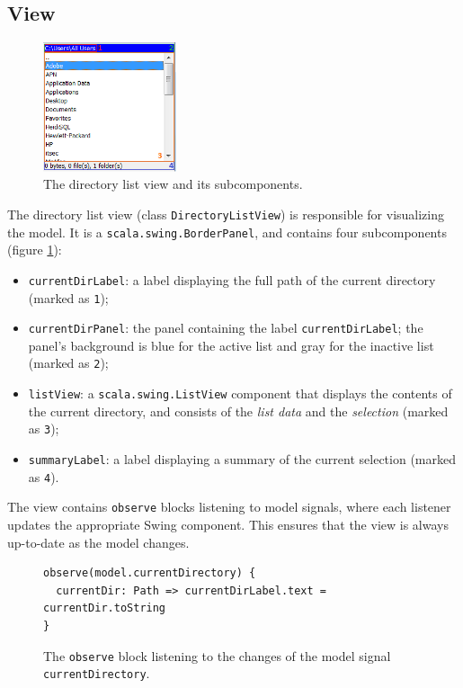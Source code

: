 \subsection{View}

\begin{figure}
  \centering
    \includegraphics[width=0.35\textwidth]{images/scala-commander-directoryListView.png}
  \caption{The directory list view and its subcomponents.}
  \label{fig:scomm_directoryListView}  
\end{figure}

The directory list view (class \texttt{DirectoryListView}) is responsible for visualizing the model. It is a \texttt{scala.swing.BorderPanel}, and contains four subcomponents (figure \ref{fig:scomm_directoryListView}):
\begin{itemize}
\item \texttt{currentDirLabel}: a label displaying the full path of the current directory (marked as \texttt{1});
\item \texttt{currentDirPanel}: the panel containing the label \texttt{currentDirLabel}; the panel's background is blue for the active list and gray for the inactive list (marked as \texttt{2});
\item \texttt{listView}: a \texttt{scala.swing.ListView} component that displays the contents of the current directory, and consists of the \emph{list data} and the \emph{selection} (marked as \texttt{3});
\item \texttt{summaryLabel}: a label displaying a summary of the current selection (marked as \texttt{4}).
\end{itemize}

The view contains \texttt{observe} blocks listening to model signals, where each listener updates the appropriate Swing component. This ensures that the view is always up-to-date as the model changes.

\begin{figure}[h!]
\centering
\begin{lstlisting}[frame=single]
observe(model.currentDirectory) {
  currentDir: Path => currentDirLabel.text = currentDir.toString
}
\end{lstlisting}
\caption{The \texttt{observe} block listening to the changes of the model signal \texttt{currentDirectory}.}
\label{fig:scomm_observe_currentDir}
\end{figure}

